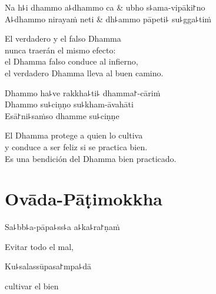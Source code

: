 \clearpage

\begin{twochants}
  Na h꜕i dhammo a꜕dhammo ca & ubho s꜕ama-vipāki꜓no \\
  A꜕dhammo nirayaṁ neti & dh꜕ammo pāpeti꜕ su꜕gga꜕tiṁ \\
\end{twochants}

\begin{english}
  El verdadero  y el falso Dhamma\\
  nunca traerán el mismo efecto:\\
  el Dhamma falso conduce al infierno,\\
  el verdadero Dhamma lleva al buen camino.
\end{english}

Dhammo ha꜕ve rakkha꜕ti꜕ dhamma꜓-cāriṁ\\
Dhammo su꜕ciṇṇo su꜕kham-āvahāti\\
Esā꜓ni꜕saṁso dhamme su꜕ciṇṇe


\begin{english}
  El Dhamma protege a quien lo cultiva\\
  y conduce a ser feliz si se practica bien.\\
  Es una bendición del Dhamma bien practicado.
\end{english}

\chapter{Ovāda-Pāṭimokkha}


\enlargethispage{\baselineskip}

\begin{leader}
\end{leader}

Sa꜕bb꜕a-pāpa꜕ss꜕a a꜕ka꜕ra꜓ṇaṁ
	
	\begin{english}
		Evitar todo el mal,
	\end{english}
	
	Ku꜕salassūpasa꜓mpa꜕dā
	
	\begin{english}
		cultivar el bien
	\end{english}
	
